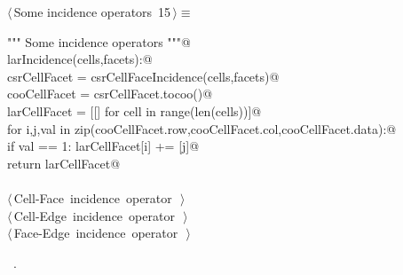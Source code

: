 \documentclass[11pt,oneside]{article}	%
\begin{document}
\begin{flushleft} \small \label{scrap26}
\protect{}$\langle\,$Some incidence operators\nobreak\ {\footnotesize 15}$\,\rangle\equiv$
\vspace{-1ex}
\begin{list}{}{} \item
\mbox{}\verb@""" Some incidence operators """@\\
\mbox{}\verb@def larIncidence(cells,facets):@\\
\mbox{}\verb@   csrCellFacet = csrCellFaceIncidence(cells,facets)@\\
\mbox{}\verb@   cooCellFacet = csrCellFacet.tocoo()@\\
\mbox{}\verb@   larCellFacet = [[] for cell in range(len(cells))]@\\
\mbox{}\verb@   for i,j,val in zip(cooCellFacet.row,cooCellFacet.col,cooCellFacet.data):@\\
\mbox{}\verb@      if val == 1: larCellFacet[i] += [j]@\\
\mbox{}\verb@   return larCellFacet@\\
\mbox{}\verb@@\\
\mbox{}\verb@@\hbox{$\langle\,$Cell-Face incidence operator\nobreak\ {\footnotesize {}}$\,\rangle$}\verb@@\\
\mbox{}\verb@@\hbox{$\langle\,$Cell-Edge incidence operator\nobreak\ {\footnotesize {}}$\,\rangle$}\verb@@\\
\mbox{}\verb@@\hbox{$\langle\,$Face-Edge incidence operator\nobreak\ {\footnotesize {}}$\,\rangle$}\verb@@\\
\mbox{}\verb@@{\NWsep}
\end{list}
\vspace{-1ex}
\footnotesize\addtolength{\baselineskip}{-1ex}
\begin{list}{}{\setlength{\itemsep}{-\parsep}\setlength{\itemindent}{-\leftmargin}}
\item \NWtxtMacroRefIn\ .
\end{list}
\end{flushleft}
\end{document}
